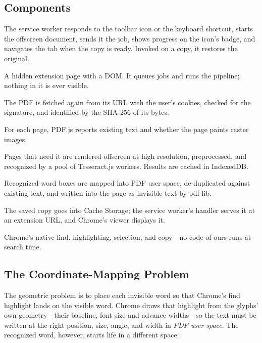 \subsection{Components}
\begin{description}[leftmargin=1.4em, style=nextline]
  \item[Activation and coordination] The service worker responds to the toolbar
        icon or the keyboard shortcut, starts the offscreen document, sends it the
        job, shows progress on the icon's badge, and navigates the tab when the
        copy is ready. Invoked on a copy, it restores the original.
  \item[Offscreen document] A hidden extension page with a DOM. It queues jobs
        and runs the pipeline; nothing in it is ever visible.
  \item[Download and identity] The PDF is fetched again from its URL with the
        user's cookies, checked for the  signature, and identified
        by the SHA-256 of its bytes.
  \item[Text detection] For each page, PDF.js reports existing text and whether
        the page paints raster images.
  \item[OCR] Pages that need it are rendered offscreen at high resolution,
        preprocessed, and recognized by a pool of Tesseract.js workers. Results
        are cached in IndexedDB.
  \item[Mapping and embedding] Recognized word boxes are mapped into PDF user
        space, de-duplicated against existing text, and written into the page as
        invisible text by pdf-lib.
  \item[Delivery] The saved copy goes into Cache Storage; the service worker's
         handler serves it at an extension URL, and Chrome's viewer
        displays it.
  \item[Search] Chrome's native find, highlighting, selection, and copy---no
        code of ours runs at search time.
\end{description}

\subsection{The Coordinate-Mapping Problem}
\label{sec:coords}
The geometric problem is to place each invisible word so that Chrome's find
highlight lands on the visible word. Chrome draws that highlight from the glyphs'
own geometry---their baseline, font size and advance widths---so the text must be
written at the right position, size, angle, and width in \emph{PDF user space}.
The recognized word, however, starts life in a different space:

